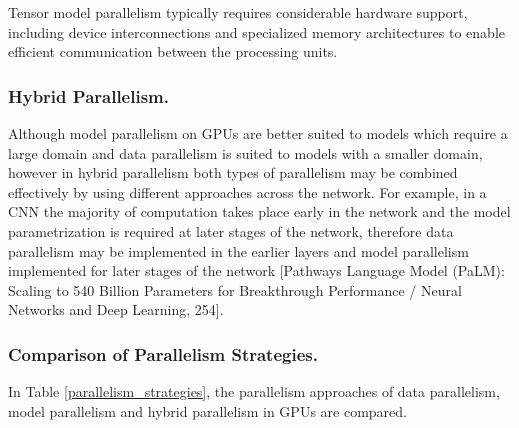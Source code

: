 \documentclass[10pt]{article}[draft]
\begin{document}
Tensor model parallelism typically requires considerable hardware support, including  device interconnections and specialized memory architectures to enable efficient communication between the processing units.


\subsubsection{Hybrid Parallelism.}

Although model parallelism on GPUs are better suited to models which require a large domain and data parallelism is suited to models with a smaller domain, however in hybrid parallelism both types of parallelism  may be combined effectively by using different approaches across the network. For example, in a CNN the majority of computation takes place early in the network and the model parametrization is required at later stages of the network, therefore data parallelism may be implemented in the earlier layers and model parallelism implemented for later stages of the network [Pathways Language Model (PaLM): Scaling to 540 Billion Parameters for Breakthrough Performance / Neural Networks and Deep Learning, 254].

\subsubsection{Comparison of Parallelism Strategies.}

In Table \ref{parallelism_strategies}, the parallelism approaches of data parallelism, model parallelism and hybrid parallelism in GPUs are compared. 
\end{document}
